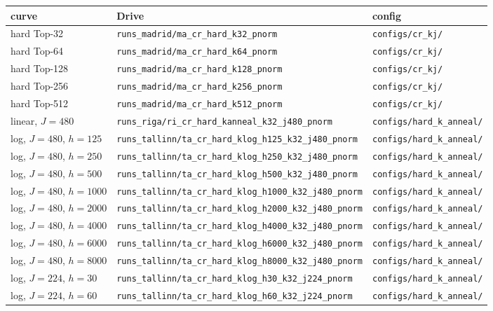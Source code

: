 \documentclass[11pt,a4paper]{article}
\newcommand{\code}[1]{\texttt{#1}}
\begin{document}
\begin{center}\footnotesize
\begin{tabular}{lll}
\toprule
curve & Drive & config \\
\midrule
hard Top-32  & \code{runs\_madrid/ma\_cr\_hard\_k32\_pnorm}  & \code{configs/cr\_kj/} \\
hard Top-64  & \code{runs\_madrid/ma\_cr\_hard\_k64\_pnorm}  & \code{configs/cr\_kj/} \\
hard Top-128 & \code{runs\_madrid/ma\_cr\_hard\_k128\_pnorm} & \code{configs/cr\_kj/} \\
hard Top-256 & \code{runs\_madrid/ma\_cr\_hard\_k256\_pnorm} & \code{configs/cr\_kj/} \\
hard Top-512 & \code{runs\_madrid/ma\_cr\_hard\_k512\_pnorm} & \code{configs/cr\_kj/} \\
linear, $J = 480$ & \code{runs\_riga/ri\_cr\_hard\_kanneal\_k32\_j480\_pnorm} & \code{configs/hard\_k\_anneal/} \\
log, $J = 480$, $h = 125$ & \code{runs\_tallinn/ta\_cr\_hard\_klog\_h125\_k32\_j480\_pnorm}  & \code{configs/hard\_k\_anneal/} \\
log, $J = 480$, $h = 250$ & \code{runs\_tallinn/ta\_cr\_hard\_klog\_h250\_k32\_j480\_pnorm}  & \code{configs/hard\_k\_anneal/} \\
log, $J = 480$, $h = 500$ & \code{runs\_tallinn/ta\_cr\_hard\_klog\_h500\_k32\_j480\_pnorm}  & \code{configs/hard\_k\_anneal/} \\
log, $J = 480$, $h = 1000$ & \code{runs\_tallinn/ta\_cr\_hard\_klog\_h1000\_k32\_j480\_pnorm} & \code{configs/hard\_k\_anneal/} \\
log, $J = 480$, $h = 2000$ & \code{runs\_tallinn/ta\_cr\_hard\_klog\_h2000\_k32\_j480\_pnorm} & \code{configs/hard\_k\_anneal/} \\
log, $J = 480$, $h = 4000$ & \code{runs\_tallinn/ta\_cr\_hard\_klog\_h4000\_k32\_j480\_pnorm} & \code{configs/hard\_k\_anneal/} \\
log, $J = 480$, $h = 6000$ & \code{runs\_tallinn/ta\_cr\_hard\_klog\_h6000\_k32\_j480\_pnorm} & \code{configs/hard\_k\_anneal/} \\
log, $J = 480$, $h = 8000$ & \code{runs\_tallinn/ta\_cr\_hard\_klog\_h8000\_k32\_j480\_pnorm} & \code{configs/hard\_k\_anneal/} \\
log, $J = 224$, $h = 30$ & \code{runs\_tallinn/ta\_cr\_hard\_klog\_h30\_k32\_j224\_pnorm} & \code{configs/hard\_k\_anneal/} \\
log, $J = 224$, $h = 60$ & \code{runs\_tallinn/ta\_cr\_hard\_klog\_h60\_k32\_j224\_pnorm} & \code{configs/hard\_k\_anneal/} \\

\end{tabular}
\end{center}
\end{document}
